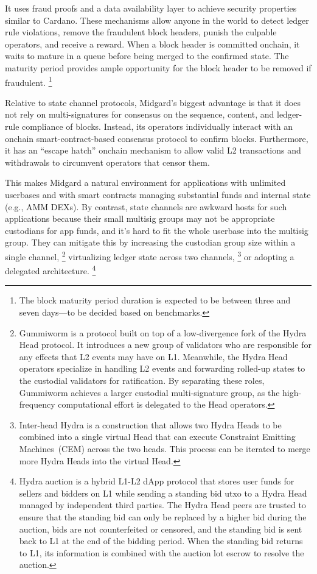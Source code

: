 \documentclass[11pt,a4paper,oneside]{article}
\begin{document}
\begin{multicols}{2}
It uses fraud proofs and a data availability layer to achieve security properties similar to Cardano.
These mechanisms allow anyone in the world to detect ledger rule violations, remove the fraudulent block headers, punish the culpable operators, and receive a reward.
When a block header is committed onchain, it waits to mature in a queue before being merged to the confirmed state.
The maturity period provides ample opportunity for the block header to be removed if fraudulent.%
\footnote{The block maturity period duration is expected to be between three and seven days---to be decided based on benchmarks.}

Relative to state channel protocols, Midgard's biggest advantage is that it does not rely on multi-signatures for consensus on the sequence, content, and ledger-rule compliance of blocks.
Instead, its operators individually interact with an onchain smart-contract-based consensus protocol to confirm blocks.
Furthermore, it has an “escape hatch” onchain mechanism to allow valid L2 transactions and withdrawals to circumvent operators that censor them.

This makes Midgard a natural environment for applications with unlimited userbases and with smart contracts managing substantial funds and internal state (e.g., AMM DEXs).
By contrast, state channels are awkward hosts for such applications because their small multisig groups may not be appropriate custodians for app funds, and it's hard to fit the whole userbase into the multisig group.
They can mitigate this by increasing the custodian group size within a single channel,%
  \footnote{Gummiworm \citep{SundaeLabsComprehensiveSpecificationDevelopment2024} is a protocol built on top of a low-divergence fork of the Hydra Head protocol. It introduces a new group of validators who are responsible for any effects that L2 events may have on L1. Meanwhile, the Hydra Head operators specialize in handling L2 events and forwarding rolled-up states to the custodial validators for ratification. By separating these roles, Gummiworm achieves a larger custodial multi-signature group, as the high-frequency computational effort is delegated to the Head operators.}
virtualizing ledger state across two channels,%
  \footnote{Inter-head Hydra \citep{JourenkoEtAlInterheadHydraTwo2023} is a construction that allows two Hydra Heads to be combined into a single virtual Head that can execute Constraint Emitting Machines~(CEM) across the two heads. This process can be iterated to merge more Hydra Heads into the virtual Head.}
or adopting a delegated architecture.%
  \footnote{Hydra auction \citep{MLabsLtdIkigaiTechHydraAuctionBlockchain2024} is a hybrid L1-L2 dApp protocol that stores user funds for sellers and bidders on L1 while sending a standing bid utxo to a Hydra Head managed by independent third parties.
    The Hydra Head peers are trusted to ensure that the standing bid can only be replaced by a higher bid during the auction, bids are not counterfeited or censored, and the standing bid is sent back to L1 at the end of the bidding period.
    When the standing bid returns to L1, its information is combined with the auction lot escrow to resolve the auction.}


\end{multicols}
\end{document}

